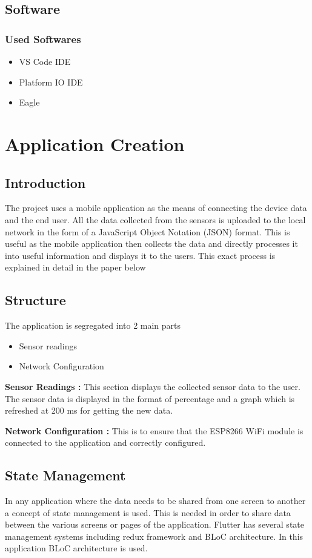 \documentclass[conference]{IEEEtran}
\begin{document}
\subsection{Software}
\subsubsection{Used Softwares}
\begin{itemize}
  \item VS Code IDE
  \item Platform IO IDE
  \item Eagle
\end{itemize}

\section{Application Creation}
\subsection{Introduction}
The project uses a mobile application as the means of connecting
the device data and the end user. All the data collected from
the sensors is uploaded to the local network in the form of a
JavaScript Object Notation (JSON) format. This is useful as the
mobile application then collects the data and directly processes
it into useful information and displays it to the users. This exact
process is explained in detail in the paper below

\subsection{Structure}
The application is segregated into 2 main parts
\begin{itemize}
  \item Sensor readings
  \item Network Configuration
\end{itemize}

\textbf{Sensor Readings : }This section displays the collected
sensor data to the user. The sensor data is displayed in the
format of percentage and a graph which is refreshed at 200 ms
for getting the new data.

\textbf{Network Configuration : } This is to ensure that the
ESP8266 WiFi module is connected to the application and correctly
configured.

\subsection{State Management}
In any application where the data needs to be shared from one
screen to another a concept of state management is used.\cite{[10]}
This is needed in order to share data between the various
screens or pages of the application. Flutter has several
state management systems including redux framework and BLoC
architecture\cite{[9]}. In this application BLoC architecture is
used.
\end{document}
